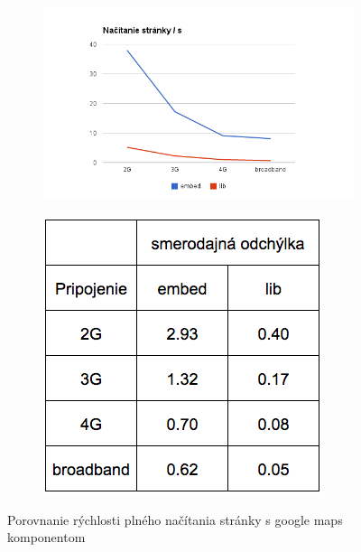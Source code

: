 \begin{figure}[H]
  \centering
  \begin{subfigure}[b]{0.6\textwidth}
          \includegraphics[width=\textwidth]{img/load/gmaps-fullload.png}
  \end{subfigure}%
  \begin{subfigure}[b]{0.32\textwidth}
          \includegraphics[width=\textwidth]{img/load/gm-std-l.png}
  \end{subfigure}%
  \caption[Porovnanie rýchlosti plného načítania stránky s google maps komponentom]{
    Porovnanie rýchlosti plného načítania stránky s google maps komponentom}
  \label{fig: gmaps-fullload}
\end{figure}

